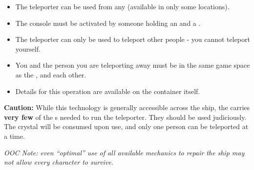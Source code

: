 \documentclass[green]{TMFHope}
\begin{document}
\begin{itemize}
  \item The teleporter can be used from any \sConsole{} (available in only some locations).
	\item The console must be activated by someone holding an \iKey{\MYname{}} and a \iCrystal{\MYname{}}.
	\item The teleporter can only be used to teleport other people - you cannot teleport yourself.
	\item You and the person you are teleporting away must be in the same game space as the \sConsole{}, and each other.
	\item Details for this operation are available on the \sConsole{} container itself.
\end{itemize}
\textbf{Caution:} While this technology is generally accessible across the ship, the \pNew{} carries \textbf{very few} of the \iCrystal{\MYname{}}s needed to run the teleporter. They should be used judiciously. The crystal will be consumed upon use, and only one person can be teleported at a time.

\emph{OOC Note: even ``optimal'' use of all available mechanics to repair the ship may not allow every character to survive.}
\end{document}
